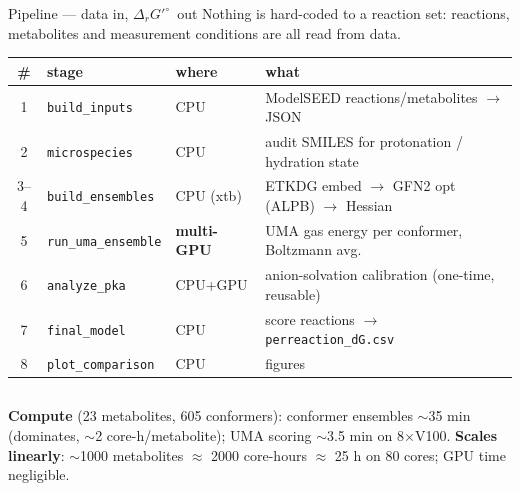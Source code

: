 \documentclass[aspectratio=169,11pt]{beamer}
\newcommand{\dg}{\ensuremath{\Delta_r G'^{\circ}}}
\begin{document}
\begin{frame}{Pipeline — data in, \dg\ out}
  \small
  Nothing is hard-coded to a reaction set: reactions, metabolites and
  measurement conditions are all read from data.
  \begin{center}
  \begin{tabular}{@{}clll@{}}
    \toprule
    \# & stage & where & what \\
    \midrule
    1 & \texttt{build\_inputs}        & CPU          & ModelSEED reactions/metabolites $\to$ JSON \\
    2 & \texttt{microspecies}         & CPU          & audit SMILES for protonation / hydration state \\
    3--4 & \texttt{build\_ensembles}  & CPU (xtb)    & ETKDG embed $\to$ GFN2 opt (ALPB) $\to$ Hessian \\
    5 & \texttt{run\_uma\_ensemble}   & \textbf{multi-GPU} & UMA gas energy per conformer, Boltzmann avg. \\
    6 & \texttt{analyze\_pka}         & CPU+GPU      & anion-solvation calibration (one-time, reusable) \\
    7 & \texttt{final\_model}         & CPU          & score reactions $\to$ \texttt{perreaction\_dG.csv} \\
    8 & \texttt{plot\_comparison}     & CPU          & figures \\
    \bottomrule
  \end{tabular}
  \end{center}
  \begin{columns}[T]
      \textbf{Compute} (23 metabolites, 605 conformers):
      conformer ensembles $\sim$35 min (dominates, $\sim$2 core-h/metabolite);
      UMA scoring $\sim$3.5 min on 8$\times$V100.
      \textbf{Scales linearly}: $\sim$1000 metabolites $\approx$ 2000 core-hours
      $\approx$ 25 h on 80 cores; GPU time negligible.
  \end{columns}
\end{frame}
\end{document}
